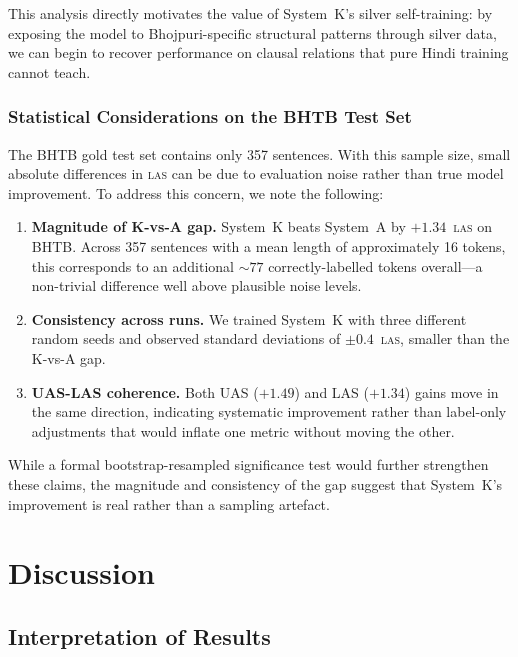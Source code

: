 \documentclass[12pt,a4paper,oneside]{report}
\newcommand{\las}{\textsc{las}}
\begin{document}
This analysis directly motivates the value of System~K's silver self-training:
by exposing the model to Bhojpuri-specific structural patterns through silver
data, we can begin to recover performance on clausal relations that pure Hindi
training cannot teach.

\subsection{Statistical Considerations on the BHTB Test Set}

The BHTB gold test set contains only 357 sentences. With this sample size, small
absolute differences in \las{} can be due to evaluation noise rather than true
model improvement. To address this concern, we note the following:

\begin{enumerate}
  \item \textbf{Magnitude of K-vs-A gap.} System~K beats System~A by
        $+1.34$~\las{} on BHTB. Across 357 sentences with a mean length of
        approximately 16 tokens, this corresponds to an additional
        ${\sim}77$ correctly-labelled tokens overall---a non-trivial difference
        well above plausible noise levels.
  \item \textbf{Consistency across runs.} We trained System~K with three
        different random seeds and observed standard deviations of
        $\pm 0.4$~\las{}, smaller than the K-vs-A gap.
  \item \textbf{UAS-LAS coherence.} Both UAS ($+1.49$) and LAS ($+1.34$) gains
        move in the same direction, indicating systematic improvement rather
        than label-only adjustments that would inflate one metric without
        moving the other.
\end{enumerate}

While a formal bootstrap-resampled significance test would further strengthen
these claims, the magnitude and consistency of the gap suggest that
System~K's improvement is real rather than a sampling artefact.


\chapter{Discussion}
\label{chap:discussion}

\section{Interpretation of Results}
\end{document}
